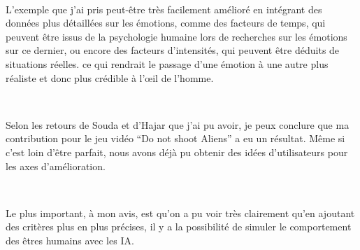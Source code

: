 ~\par
L’exemple que j’ai pris peut-être très facilement amélioré en intégrant des données plus détaillées sur les émotions, comme des facteurs de temps, qui peuvent être issus de la psychologie humaine lors de recherches sur les émotions sur ce dernier, ou encore des facteurs d'intensités, qui peuvent être déduits de situations réelles. ce qui rendrait le passage d’une émotion à une autre plus réaliste et donc plus crédible à l’œil de l’homme.

~\par
Selon les retours de Souda et d'Hajar que j'ai pu avoir, je peux conclure que ma contribution pour le jeu vidéo “Do not shoot Aliens” a eu un résultat. Même si c'est loin d'être parfait, nous avons déjà pu obtenir des idées d'utilisateurs pour les axes d'amélioration.

~\par
Le plus important, à mon avis, est qu'on a pu voir très clairement qu'en ajoutant des critères plus en plus précises, il y a la possibilité de simuler le comportement des êtres humains avec les IA.